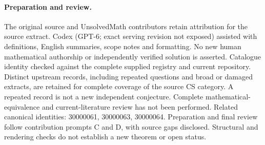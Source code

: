 \documentclass[11pt]{article}
\begin{document}
\paragraph{Preparation and review.}
The original source and UnsolvedMath contributors retain attribution for the source extract. Codex (GPT-6; exact serving revision not exposed) assisted with definitions, English summaries, scope notes and formatting. No new human mathematical authorship or independently verified solution is asserted. Catalogue identity checked against the complete supplied registry and current repository. Distinct upstream records, including repeated questions and broad or damaged extracts, are retained for complete coverage of the source CS category. A repeated record is not a new independent conjecture. Complete mathematical-equivalence and current-literature review has not been performed. Related canonical identities: 30000061, 30000063, 30000064. Preparation and final review follow contribution prompts C and D, with source gaps disclosed. Structural and rendering checks do not establish a new theorem or open status.
\label{end:statement}
\end{document}
